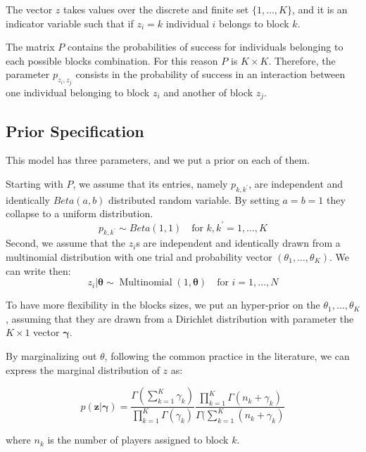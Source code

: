 \documentclass[11pt]{amsart}
\begin{document}
The vector $z$ takes values over the discrete and finite set $\{ 1 , \ldots, K\}$, and it is an indicator variable such that if $z_i = k$ individual $i$ belongs to block $k$. 

The matrix $P$ contains the probabilities of success for individuals belonging to each possible blocks combination. For this reason $P$ is $K\times K$. Therefore, the parameter $p_{z_i, z_j}$ consists in the probability of success in an interaction between one individual belonging to block $z_i$ and another of block $z_j$. 

\subsection{Prior Specification}

This model has three parameters, and we put a prior on each of them.

Starting with $P$, we assume that its entries, namely $p_{k,k^\prime}$, are independent and identically $Beta(a,b)$ distributed random variable. By setting $a=b=1$ they collapse to a uniform distribution.
\begin{equation}
p_{k,k^\prime} \sim Beta(1,1) \quad \text{for } k,k^\prime = 1, \ldots,K
\end{equation}
Second, we assume that the $z_i$s are independent and identically drawn from a multinomial distribution with one trial and probability vector $(\theta_1, \dots, \theta_K)$. We can write then:
\begin{equation}
z_i| \boldsymbol{\theta} \sim \operatorname{Multinomial}(1,\boldsymbol{\theta}) \quad \text{for } i = 1, \ldots,N
\end{equation}


To have more flexibility in the blocks sizes, we put an hyper-prior on the $\theta_1, \dots, \theta_K$, assuming that they are drawn from a Dirichlet distribution with parameter the $K\times1$ vector $\boldsymbol{\gamma}$.


By marginalizing out $\theta$, following the common practice in the literature, we can express the marginal distribution of $z$ as:

\begin{equation} p(\mathbf{z}|\boldsymbol{\gamma}) = \frac{\Gamma(\sum_{k=1}^K \gamma_k)}{\prod_{k=1}^K \Gamma(\gamma_k)}\frac{\prod_{k=1}^K \Gamma(n_k+\gamma_k)}{\Gamma(\sum_{k=1}^K (n_k+\gamma_k)}
\end{equation}

where $n_k$ is the number of players assigned to block $k$.
\end{document}
